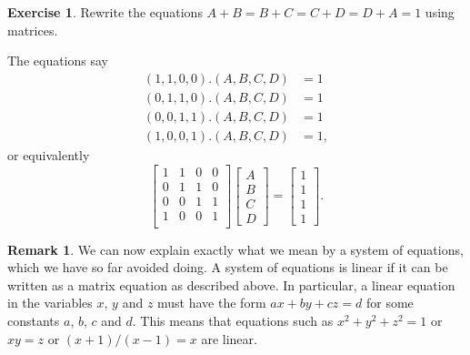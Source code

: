 \documentclass[a4paper]{book}
\theoremstyle{definition}
\newtheorem{remark}[theorem]{Remark}
\newtheorem{exercise}[theorem]{Exercise}
\renewenvironment{solution}{\SolutionInline}{\endSolutionInline}
\begin{document}
\begin{exercise}
 Rewrite the equations $A+B=B+C=C+D=D+A=1$ using matrices.
\end{exercise}
\begin{solution}
 The equations say
 \begin{align*}
  (1,1,0,0).(A,B,C,D) &= 1 \\ 
  (0,1,1,0).(A,B,C,D) &= 1 \\ 
  (0,0,1,1).(A,B,C,D) &= 1 \\ 
  (1,0,0,1).(A,B,C,D) &= 1,
 \end{align*}
 or equivalently
 \[ \begin{bmatrix}
     1&1&0&0 \\
     0&1&1&0 \\
     0&0&1&1 \\
     1&0&0&1 \\
    \end{bmatrix}
    \begin{bmatrix}
     A \\ B \\ C \\ D
    \end{bmatrix} = 
    \begin{bmatrix}
     1 \\ 1 \\ 1 \\ 1
    \end{bmatrix}.
 \]
\end{solution}

\begin{remark}
 We can now explain exactly what we mean by a  system of
 equations, which we have so far avoided doing.  A system of equations
 is linear if it can be written as a matrix equation as described
 above.  In particular, a linear equation in the variables $x$, $y$
 and $z$ must have the form $ax+by+cz=d$ for some constants $a$, $b$,
 $c$ and $d$.  This means that equations such as $x^2+y^2+z^2=1$ or
 $xy=z$ or $(x+1)/(x-1)=x$ are  linear.
\end{remark}
\end{document}
